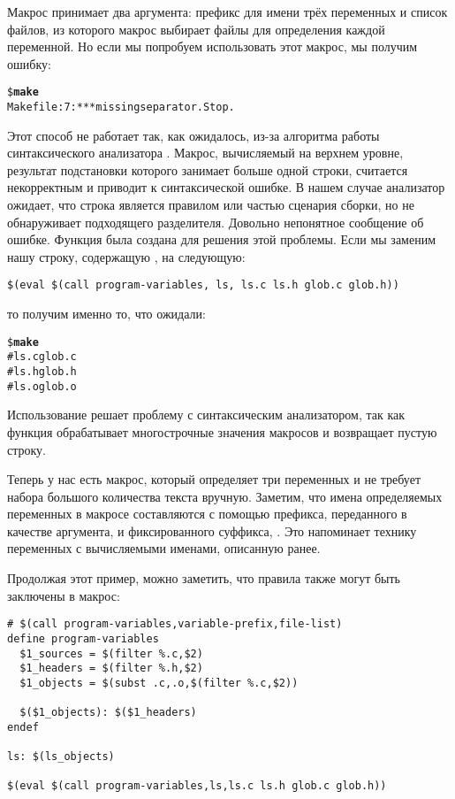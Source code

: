 Макрос  принимает два аргумента: префикс
для имени трёх переменных и список файлов, из которого макрос выбирает
файлы для определения каждой переменной. Но если мы попробуем
использовать этот макрос, мы получим ошибку:

{\footnotesize
\begin{alltt}
\$ \textbf{make}
Makefile:7: *** missing separator. Stop.
\end{alltt}
}

Этот способ не работает так, как ожидалось, из-за алгоритма работы
синтаксического анализатора \GNUmake{}. Макрос, вычисляемый на верхнем
уровне, результат подстановки которого занимает больше одной строки,
считается некорректным и приводит к синтаксической ошибке. В нашем
случае анализатор ожидает, что строка является правилом или частью
сценария сборки, но не обнаруживает подходящего разделителя. Довольно
непонятное сообщение об ошибке.  Функция  была создана
для решения этой проблемы. Если мы заменим нашу строку, содержащую
, на следующую:

{\footnotesize
\begin{verbatim}
$(eval $(call program-variables, ls, ls.c ls.h glob.c glob.h))
\end{verbatim}
}

{\flushleft то получим именно то, что ожидали:}

{\footnotesize
\begin{alltt}
\${} \textbf{make}
# ls.c glob.c
# ls.h glob.h
# ls.o glob.o
\end{alltt}
}

Использование  решает проблему с синтаксическим
анализатором, так как функция  обрабатывает
многострочные значения макросов и возвращает пустую строку.

Теперь у нас есть макрос, который определяет три переменных и не
требует набора большого количества текста вручную. Заметим, что имена
определяемых переменных в макросе составляются с помощью префикса,
переданного в качестве аргумента, и фиксированного суффикса,
. Это напоминает технику переменных с
вычисляемыми именами, описанную ранее.

Продолжая этот пример, можно заметить, что правила также могут быть
заключены в макрос:

{\footnotesize
\begin{verbatim}
# $(call program-variables,variable-prefix,file-list)
define program-variables
  $1_sources = $(filter %.c,$2)
  $1_headers = $(filter %.h,$2)
  $1_objects = $(subst .c,.o,$(filter %.c,$2))

  $($1_objects): $($1_headers)
endef

ls: $(ls_objects)

$(eval $(call program-variables,ls,ls.c ls.h glob.c glob.h))
\end{verbatim}
}

